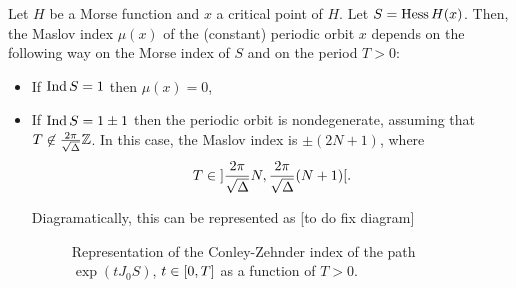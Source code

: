 \begin{prop}
Let $H$ be a Morse function and $x$ a critical point of $H$. Let $S = \operatorname{Hess} H(x)$. Then, the Maslov index $\mu(x)$ of the (constant) periodic orbit $x$ depends on the following way on the Morse index of $S$ and on the period $T > 0$:
\begin{itemize}
\item If $\operatorname{Ind} S = 1$ then $\mu(x) = 0$,
\item If $\operatorname{Ind} S = 1 \pm 1$ then the periodic orbit is nondegenerate, assuming that $T \not \in \frac{2 \pi}{\sqrt\Delta} \mathbb{Z}$. In this case, the Maslov index is $\pm(2N+1)$, where
\begin{equation}
T \in \ointerval{\frac{2\pi}{\sqrt\Delta}N}{\frac{2\pi}{\sqrt\Delta}(N+1)}.
\end{equation}

Diagramatically, this can be represented as [to do fix diagram]
\begin{figure}[H]
\centering
{}
\caption{Representation of the Conley-Zehnder index of the path $\exp(t J_0 S)$, $t \in \interval 0 T$ as a function of $T > 0$.}
\end{figure}
\end{itemize}
\end{prop}

